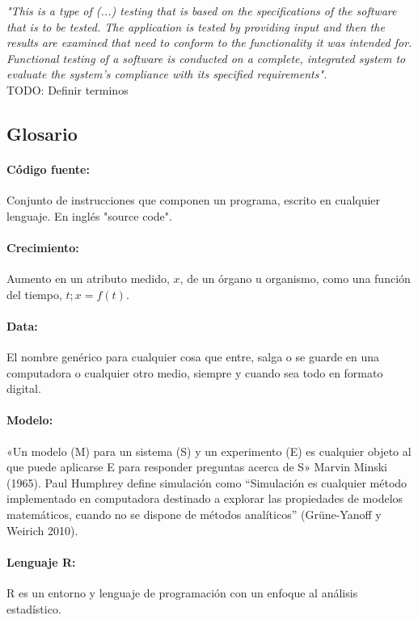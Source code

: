\textit{"This is a type of (...) testing that is based on the specifications of the software that is to be tested. The application is tested by providing input and then the results are examined that need to conform to the functionality it was intended for. Functional testing of a software is conducted on a complete, integrated system to evaluate the system’s compliance with its specified requirements".}\\

TODO: Definir terminos\\

\subsection{Glosario}

\paragraph{C\'odigo fuente:} Conjunto de instrucciones que componen un programa, escrito en cualquier lenguaje. En ingl\'es "source code".
\paragraph{Crecimiento:} Aumento en un atributo medido, $x$, de un \'organo u organismo, como una funci\'on del tiempo, $t;x = f (t)$.
\paragraph{Data:} El nombre gen\'erico para cualquier cosa que entre, salga o se guarde en una computadora o cualquier otro medio, siempre y cuando sea todo en formato digital.
\paragraph{Modelo:} «Un modelo (M) para un sistema (S) y un experimento (E) es cualquier objeto al que puede aplicarse E para responder preguntas acerca de S» Marvin Minski (1965). Paul Humphrey define simulaci\'on como “Simulaci\'on es cualquier m\'etodo implementado en computadora destinado a explorar las propiedades de modelos matem\'aticos, cuando no se dispone de m\'etodos analíticos” (Grüne-Yanoff y Weirich 2010).
\paragraph{Lenguaje R:} R es un entorno y lenguaje de programaci\'on con un enfoque al an\'alisis estad\'istico.
